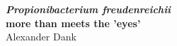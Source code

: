 


\thispagestyle{empty}
\begin{center}
\Huge{\textbf{\textit{Propionibacterium freudenreichii}}} \\
\Huge{\textbf{more than meets the 'eyes'}} \\
\vspace*{1cm}
\vspace*{1cm}
\vspace*{\fill}
\large{Alexander Dank} \\
\end{center}

